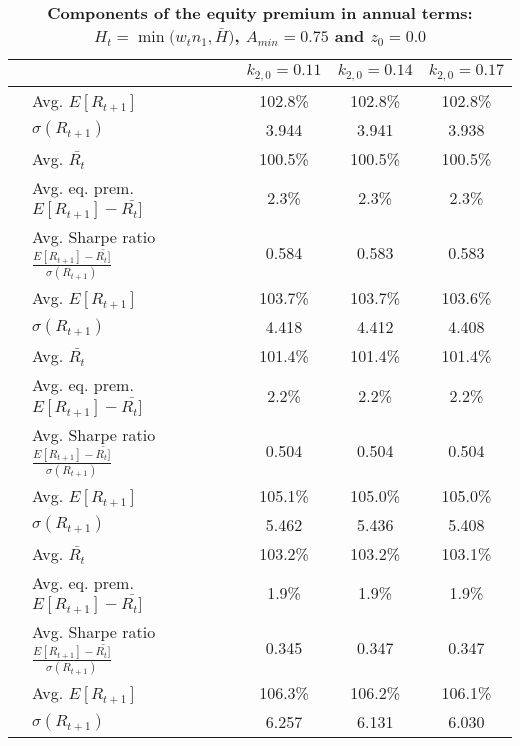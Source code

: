 \documentclass[letterpaper,12pt]{article}
\theoremstyle{definition}
\begin{document}
\begin{spacing}{1.5}
  \begin{table}[htbp]\centering\captionsetup{width=6.0in}
    \caption{\label{TabEqPrem_A75}\textbf{Components of the equity premium in annual terms: $H_t = \min\bigl(w_t n_1, \bar{H}\bigr)$, $A_{min}=0.75$ and $z_0=0.0$}}
    \begin{threeparttable}
    \begin{tabular}{>{\small}l| >{\small}l| >{\small}c| >{\small}c| >{\small}c}
      \hline\hline
      & & $k_{2,0}=0.11$ & $k_{2,0}=0.14$ & $k_{2,0}=0.17$ \\
      \hline
      \multirow{5}{*}{$\bar{H}=0.00$} & \quad Avg. $E[R_{t+1}]$ & 102.8\% & 102.8\% & 102.8\% \\
      & \quad $\sigma(R_{t+1})$ & 3.944 & 3.941 & 3.938 \\
      & \quad Avg. $\bar{R_t}$ & 100.5\% & 100.5\% & 100.5\% \\
      & \quad Avg. eq. prem. $E[R_{t+1}] - \bar{R_t]}$ & 2.3\% & 2.3\% & 2.3\% \\
      & \quad Avg. Sharpe ratio $\frac{E[R_{t+1}] - \bar{R_t]}}{\sigma(R_{t+1})}$ & 0.584 & 0.583 & 0.583 \\
      \hline
      \multirow{5}{*}{$\bar{H}=0.05$} & \quad Avg. $E[R_{t+1}]$ & 103.7\% & 103.7\% & 103.6\% \\
      & \quad $\sigma(R_{t+1})$ & 4.418 & 4.412 & 4.408 \\
      & \quad Avg. $\bar{R_t}$ & 101.4\% & 101.4\% & 101.4\% \\
      & \quad Avg. eq. prem. $E[R_{t+1}] - \bar{R_t]}$ & 2.2\% & 2.2\% & 2.2\% \\
      & \quad Avg. Sharpe ratio $\frac{E[R_{t+1}] - \bar{R_t]}}{\sigma(R_{t+1})}$ & 0.504 & 0.504 & 0.504 \\
      \hline
      \multirow{5}{*}{$\bar{H}=0.11$} & \quad Avg. $E[R_{t+1}]$ & 105.1\% & 105.0\% & 105.0\% \\
      & \quad $\sigma(R_{t+1})$ & 5.462 & 5.436 & 5.408 \\
      & \quad Avg. $\bar{R_t}$ & 103.2\% & 103.2\% & 103.1\% \\
      & \quad Avg. eq. prem. $E[R_{t+1}] - \bar{R_t]}$ & 1.9\% & 1.9\% & 1.9\% \\
      & \quad Avg. Sharpe ratio $\frac{E[R_{t+1}] - \bar{R_t]}}{\sigma(R_{t+1})}$ & 0.345 & 0.347 & 0.347 \\
      \hline
      \multirow{5}{*}{$\bar{H}=0.17$} & \quad Avg. $E[R_{t+1}]$ & 106.3\% & 106.2\% & 106.1\% \\
      & \quad $\sigma(R_{t+1})$ & 6.257 & 6.131 & 6.030 \\

\end{tabular}
\end{threeparttable}
\end{table}
\end{spacing}
\end{document}
